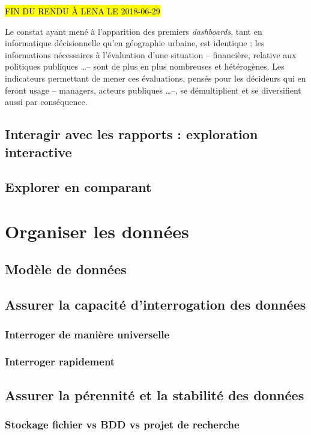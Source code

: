 	\begin{center}
		\hl{FIN DU RENDU À LENA LE 2018-06-29}
	\end{center}	

	Le constat ayant mené à l'apparition des premiers \textit{dashboards}, tant en informatique décisionnelle qu'en géographie urbaine, est identique : les informations nécessaires à l'évaluation d'une situation -- financière, relative aux politiques publiques \dots -- sont de plus en plus nombreuses et hétérogènes.
	Les indicateurs permettant de mener ces évaluations, pensés pour les décideurs qui en feront usage -- managers, acteurs publiques \dots --, se démultiplient et se diversifient aussi par conséquence.


	\subsection{Interagir avec les rapports : exploration interactive}
	\subsection{Explorer en comparant}

\section{Organiser les données}
	\subsection{Modèle de données}
	\subsection{Assurer la capacité d'interrogation des données}
		\subsubsection{Interroger de manière universelle}
		\subsubsection{Interroger rapidement}
	\subsection{Assurer la pérennité et la stabilité des données}
		\subsubsection{Stockage fichier vs BDD vs projet de recherche}
